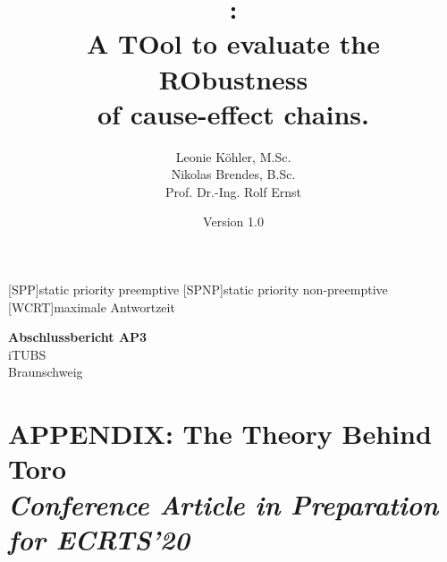 \documentclass[11pt, a4paper, openany]{article}
\newcommand{\Tool}{
\textbf{\textsc{\rmfamily{Toro}}}\xspace}
\begin{document}
 

\begin{acronym}[ECU]
[SPP]{static priority preemptive}
[SPNP]{static priority non-preemptive}
[WCRT]{maximale Antwortzeit}
\end{acronym}


\newcommand{\EqSize}{\small}			%
\newcommand{\AlgSize}{\small}			%
\newcommand{\LstSize}{\scriptsize}			%
\preto\align{\par\nobreak\EqSize\noindent}
\preto\equation{\par\nobreak\EqSize\noindent}
\preto\algorithmic{\par\nobreak\AlgSize\noindent}

\begin{titlepage}
\pagestyle{plain}

\title{\Tool: \\
\LARGE{A TOol to evaluate the RObustness}\\ 
\LARGE{of cause-effect chains}.}
\author{
Leonie Köhler, M.Sc.\\%
Nikolas Brendes, B.Sc. \\
Prof. Dr.-Ing. Rolf Ernst}
\date{Version 1.0}
\maketitle 
\thispagestyle{empty}


\begin{flushright}

\Large\textbf{Abschlussbericht AP3}
\\[1cm]
\large
iTUBS \\ Braunschweig 
\end{flushright} 


\end{titlepage}

\pagestyle{plain}

\tableofcontents
\clearpage
\clearpage
\pagestyle{fancyplain}




\newpage

\newpage

\newpage

\newpage
\appendix
\section{APPENDIX: The Theory Behind Toro\\ \emph{Conference Article in Preparation for ECRTS'20}}

\end{document}
